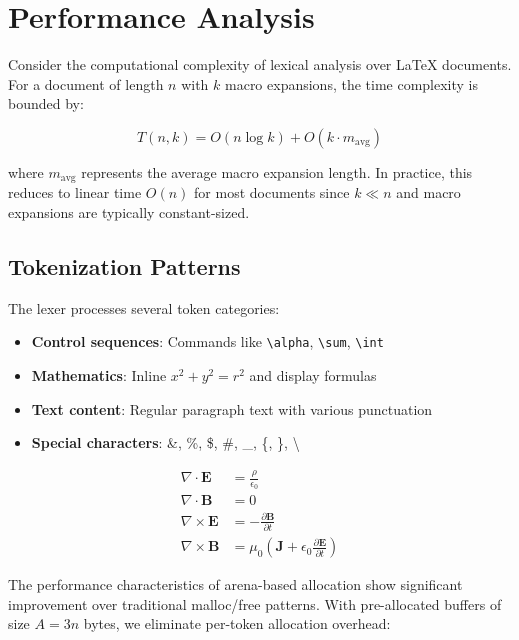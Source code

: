 \documentclass[11pt]{article}
\begin{document}
\section{Performance Analysis}

Consider the computational complexity of lexical analysis over LaTeX documents. For a document of length $n$ with $k$ macro expansions, the time complexity is bounded by:

\begin{equation}
T(n,k) = O(n \log k) + O(k \cdot m_{\text{avg}})
\end{equation}

where $m_{\text{avg}}$ represents the average macro expansion length. In practice, this reduces to linear time $O(n)$ for most documents since $k \ll n$ and macro expansions are typically constant-sized.

\subsection{Tokenization Patterns}

The lexer processes several token categories:
\begin{itemize}
    \item \textbf{Control sequences}: Commands like \texttt{\textbackslash alpha}, \texttt{\textbackslash sum}, \texttt{\textbackslash int}
    \item \textbf{Mathematics}: Inline $x^2 + y^2 = r^2$ and display formulas
    \item \textbf{Text content}: Regular paragraph text with various punctuation
    \item \textbf{Special characters}: \&, \%, \$, \#, \_, \{, \}, \textbackslash
\end{itemize}

\begin{align}
\nabla \cdot \mathbf{E} &= \frac{\rho}{\epsilon_0} \\
\nabla \cdot \mathbf{B} &= 0 \\
\nabla \times \mathbf{E} &= -\frac{\partial \mathbf{B}}{\partial t} \\
\nabla \times \mathbf{B} &= \mu_0 \left( \mathbf{J} + \epsilon_0 \frac{\partial \mathbf{E}}{\partial t} \right)
\end{align}

The performance characteristics of arena-based allocation show significant improvement over traditional malloc/free patterns. With pre-allocated buffers of size $A = 3n$ bytes, we eliminate per-token allocation overhead:
\end{document}
